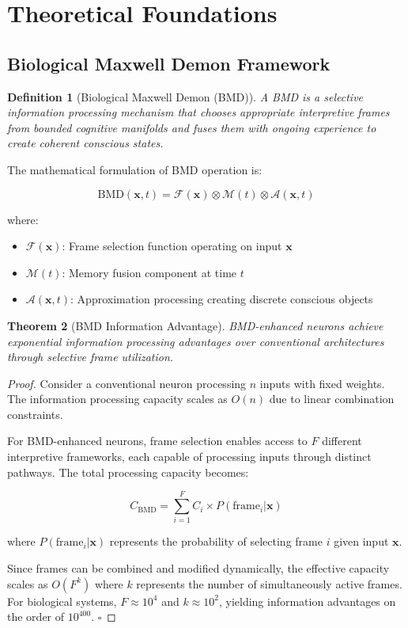 \documentclass[12pt,a4paper]{article}
\newtheorem{theorem}{Theorem}[section]
\newtheorem{definition}[theorem]{Definition}
\theoremstyle{remark}
\begin{document}
\section{Theoretical Foundations}

\subsection{Biological Maxwell Demon Framework}

\begin{definition}[Biological Maxwell Demon (BMD)]
A BMD is a selective information processing mechanism that chooses appropriate interpretive frames from bounded cognitive manifolds and fuses them with ongoing experience to create coherent conscious states.
\end{definition}

The mathematical formulation of BMD operation is:

\begin{equation}
\text{BMD}(\mathbf{x}, t) = \mathcal{F}(\mathbf{x}) \otimes \mathcal{M}(t) \otimes \mathcal{A}(\mathbf{x}, t)
\end{equation}

where:
\begin{itemize}
\item $\mathcal{F}(\mathbf{x})$: Frame selection function operating on input $\mathbf{x}$
\item $\mathcal{M}(t)$: Memory fusion component at time $t$
\item $\mathcal{A}(\mathbf{x}, t)$: Approximation processing creating discrete conscious objects
\end{itemize}

\begin{theorem}[BMD Information Advantage]
BMD-enhanced neurons achieve exponential information processing advantages over conventional architectures through selective frame utilization.
\end{theorem}

\begin{proof}
Consider a conventional neuron processing $n$ inputs with fixed weights. The information processing capacity scales as $O(n)$ due to linear combination constraints.

For BMD-enhanced neurons, frame selection enables access to $F$ different interpretive frameworks, each capable of processing inputs through distinct pathways. The total processing capacity becomes:

\begin{equation}
C_{\text{BMD}} = \sum_{i=1}^{F} C_i \times P(\text{frame}_i | \mathbf{x})
\end{equation}

where $P(\text{frame}_i | \mathbf{x})$ represents the probability of selecting frame $i$ given input $\mathbf{x}$.

Since frames can be combined and modified dynamically, the effective capacity scales as $O(F^k)$ where $k$ represents the number of simultaneously active frames. For biological systems, $F \approx 10^4$ and $k \approx 10^2$, yielding information advantages on the order of $10^{400}$. $\square$
\end{proof}
\end{document}
